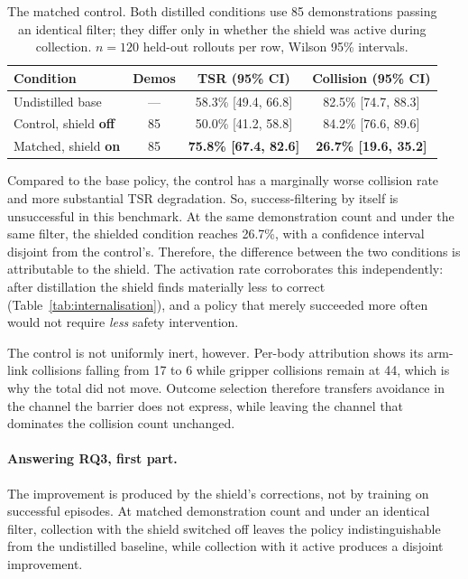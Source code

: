 \documentclass[a4paper,11pt]{report}
\begin{document}
\begin{table}[htbp]
\centering
\caption{The matched control. Both distilled conditions use 85 demonstrations passing an identical
  filter; they differ only in whether the shield was active during collection. $n = 120$ held-out
  rollouts per row, Wilson 95\% intervals.}
\label{tab:matched_control}
\begin{tabular}{lccc}
\toprule
\textbf{Condition} & \textbf{Demos} & \textbf{TSR (95\% CI)} & \textbf{Collision (95\% CI)} \\
\midrule
Undistilled base & ---            & 58.3\% [49.4, 66.8] & 82.5\% [74.7, 88.3] \\
Control, shield \textbf{off}  & 85 & 50.0\% [41.2, 58.8] & 84.2\% [76.6, 89.6] \\
Matched, shield \textbf{on}   & 85 & \textbf{75.8\% [67.4, 82.6]} & \textbf{26.7\% [19.6, 35.2]} \\
\bottomrule
\end{tabular}
\end{table}

Compared to the base policy, the control has a marginally worse collision rate and more substantial TSR degradation. So, success-filtering by itself is unsuccessful in this benchmark. At the same demonstration count and under the same filter, the shielded condition reaches 26.7\%, with a confidence interval disjoint from the control's. Therefore, the difference between the two conditions is attributable to the shield. The activation rate corroborates this independently: after distillation the shield finds materially less to correct (Table~\ref{tab:internalisation}), and a policy that merely succeeded more often would not require \emph{less} safety intervention.

The control is not uniformly inert, however. Per-body attribution shows its arm-link collisions
falling from 17 to 6 while gripper collisions remain at 44, which is why the total did not move.
Outcome selection therefore transfers avoidance in the channel the barrier does not express, while
leaving the channel that dominates the collision count unchanged.

\paragraph{Answering RQ3, first part.}
The improvement is produced by the shield's corrections, not by training on successful episodes.
At matched demonstration count and under an identical filter, collection with the shield switched
off leaves the policy indistinguishable from the undistilled baseline, while collection with it
active produces a disjoint improvement.
\end{document}
